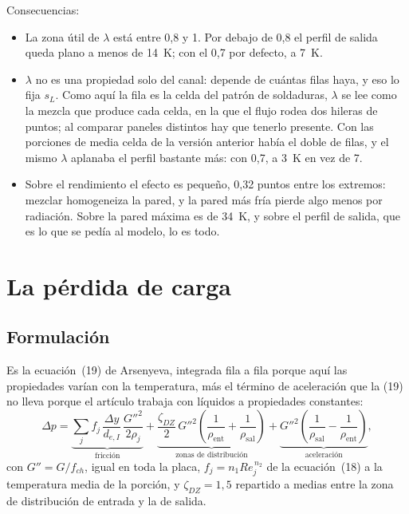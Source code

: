 \documentclass[11pt,a4paper]{article}
\begin{document}
Consecuencias:
\begin{itemize}
  \item La zona útil de $\lambda$ está entre 0,8 y 1. Por debajo de 0,8 el
        perfil de salida queda plano a menos de 14~K; con el 0,7 por defecto,
        a 7~K.
  \item $\lambda$ no es una propiedad solo del canal: depende de cuántas filas
        haya, y eso lo fija $s_L$. Como aquí la fila es la celda del patrón de
        soldaduras, $\lambda$ se lee como la mezcla que produce cada celda, en
        la que el flujo rodea dos hileras de puntos; al comparar paneles
        distintos hay que tenerlo presente. Con las porciones de media celda de
        la versión anterior había el doble de filas, y el mismo $\lambda$
        aplanaba el perfil bastante más: con 0,7, a 3~K en vez de 7.
  \item Sobre el rendimiento el efecto es pequeño, 0,32 puntos entre los
        extremos: mezclar homogeneiza la pared, y la pared más fría pierde algo
        menos por radiación. Sobre la pared máxima es de 34~K, y sobre el perfil
        de salida, que es lo que se pedía al modelo, lo es todo.
\end{itemize}

\section{La pérdida de carga}
\label{sec:dp}

\subsection{Formulación}

Es la ecuación~(19) de Arsenyeva, integrada fila a fila porque aquí las
propiedades varían con la temperatura, más el término de aceleración que la (19)
no lleva porque el artículo trabaja con líquidos a propiedades constantes:
\[
  \Delta p = \underbrace{\sum_j f_j\,\frac{\Delta y}{d_{e,I}}\,\frac{G''^2}{2\rho_j}}_{\text{fricción}}
  + \underbrace{\frac{\zeta_{DZ}}{2}\,G''^2\left(\frac{1}{\rho_{\mathrm{ent}}}
    + \frac{1}{\rho_{\mathrm{sal}}}\right)}_{\text{zonas de distribución}}
  + \underbrace{G''^2\left(\frac{1}{\rho_{\mathrm{sal}}}
    - \frac{1}{\rho_{\mathrm{ent}}}\right)}_{\text{aceleración}},
\]
con $G'' = G/f_{ch}$, igual en toda la placa, $f_j = n_1 Re_j^{\,n_2}$ de la
ecuación~(18) a la temperatura media de la porción, y $\zeta_{DZ} = 1{,}5$
repartido a medias entre la zona de distribución de entrada y la de salida.
\end{document}
